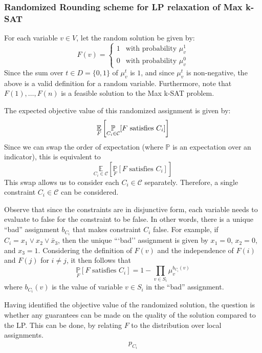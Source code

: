 \subsubsection{Randomized Rounding scheme for LP relaxation of Max k-SAT}
For each variable $v \in V$, let the random solution be given by:
\[
	F(v) = \begin{cases}
	1 & \text{with probability } \mu_v^1\\
	0 & \text{with probability } \mu_v^0
	\end{cases}
\]
Since the sum over $t \in D = \{0,1\}$ of  $\mu_v^t$ is $1$, and since $\mu_v^t$ is non-negative, the above is a valid definition for a random variable. 
Furthermore, note that $F(1), \dots, F(n)$ is a feasible solution to the Max k-SAT problem.

The expected objective value of this randomized assignment is given by:
\[
	\underset{F}{\mathbb{E}}\left[ \underset{C_i \in \mathcal{C}}{\mathbb{P}}[ F \text{ satisfies } C_i] \right]
\]
Since we can swap the order of expectation (where $\mathbb{P}$ is an expectation over an indicator), this is equivalent to
\[
\underset{C_i \in \mathcal{C}}{\mathbb{E}}\left[ \underset{F}{\mathbb{P}}[ F \text{ satisfies } C_i] \right]
\]
This swap allows us to consider each $C_i \in \mathcal{C}$ separately. 
Therefore, a single constraint $C_i \in \mathcal{C}$ can be considered.

Observe that since the constraints are in disjunctive form, each variable needs to evaluate to false for the constraint to be false. 
In other words, there is a unique ``bad'' assignment $b_{C_i}$ that makes constraint $C_i$ false. 
For example, if $C_i = x_1 \vee x_2 \vee \bar{x}_3$, then the unique ```bad'' assignment is given by $x_1 = 0$, $x_2 = 0$, and $x_3 = 1$. 
Considering the definition of $F(v)$ and the independence of $F(i)$ and $F(j)$ for $i \neq j$, it then follows that 
\[
	\underset{F}{\mathbb{P}}[ F \text{ satisfies } C_i] = 1 - \prod_{v \in S_i} \mu_v^{b_{C_i}(v)}
\]
where $b_{C_i}(v)$ is the value of variable $v \in S_i$ in the ``bad'' assignment.

Having identified the objective value of the randomized solution, the question is whether any guarantees can be made on the quality of the solution compared to the LP. This can be done, by relating $F$ to the distribution over local assignments.
\begin{align*}
	p_{C_i}
\end{align*}
